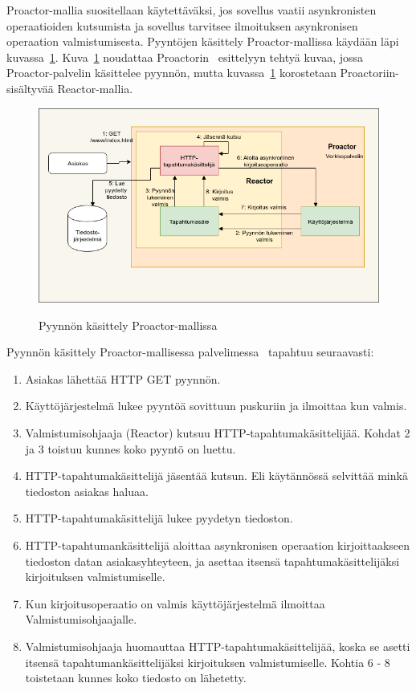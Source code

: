 \documentclass[finnish]{tktltiki2}
\theoremstyle{definition}
\theoremstyle{remark}
\begin{document}
Proactor-mallia suositellaan käytettäväksi, jos sovellus vaatii
asynkronisten operaatioiden kutsumista ja sovellus tarvitsee ilmoituksen
asynkronisen operaation valmistumisesta.
Pyyntöjen käsittely Proactor-mallissa käydään läpi kuvassa~\ref{fig:proactor}.
Kuva~\ref{fig:proactor} noudattaa Proactorin~\cite{pyarali_proactor_1997} esittelyyn tehtyä
kuvaa, jossa Proactor-palvelin käsittelee pyynnön, mutta kuvassa~\ref{fig:proactor}
korostetaan Proactoriin-sisältyvää Reactor-mallia.
\begin{figure}
  \caption{Pyynnön käsittely Proactor-mallissa~\cite{pyarali_proactor_1997}}
  \includegraphics[scale=0.5]{Proactor.png}\label{fig:proactor}
\end{figure}
Pyynnön käsittely Proactor-mallisessa palvelimessa~\cite{pyarali_proactor_1997} 
tapahtuu seuraavasti:
    \begin{enumerate}
      \item Asiakas lähettää HTTP GET pyynnön.
      \item Käyttöjärjestelmä lukee pyyntöä sovittuun puskuriin ja ilmoittaa kun valmis.
      \item Valmistumisohjaaja (Reactor) kutsuu HTTP-tapahtumakäsittelijää.
        Kohdat 2 ja 3 toistuu kunnes koko pyyntö on luettu.
      \item HTTP-tapahtumakäsittelijä jäsentää kutsun. Eli
        käytännössä selvittää minkä tiedoston asiakas haluaa.
      \item HTTP-tapahtumakäsittelijä lukee pyydetyn tiedoston.
      \item HTTP-tapahtumankäsittelijä aloittaa asynkronisen operaation
        kirjoittaakseen tiedoston datan asiakasyhteyteen, ja asettaa
        itsensä tapahtumakäsittelijäksi kirjoituksen valmistumiselle.
      \item Kun kirjoitusoperaatio on valmis käyttöjärjestelmä ilmoittaa
        Valmistumisohjaajalle.
      \item Valmistumisohjaaja huomauttaa HTTP-tapahtumakäsittelijää,
        koska se asetti itsensä tapahtumankäsittelijäksi kirjoituksen
        valmistumiselle. Kohtia 6 - 8 toistetaan kunnes koko tiedosto on lähetetty.
    \end{enumerate}
\end{document}
